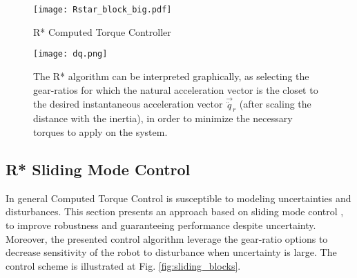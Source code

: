\begin{figure}[t]
	\centering
		\texttt{[image: Rstar\_block\_big.pdf]}
	\caption{R* Computed Torque Controller}
	\label{fig:Rstar_block_big}
\end{figure}

\begin{figure}[htp]
	\centering
		\texttt{[image: dq.png]}
	\caption[R* algorithm graphical interpretation]{The R* algorithm can be interpreted graphically, as selecting the gear-ratios for which the natural acceleration vector is the closet to the desired instantaneous acceleration vector $\vec{\ddot{q}}_r$ (after scaling the distance with the inertia), in order to minimize the necessary torques to apply on the system.}
	\label{fig:dq}
\end{figure}

\subsection{R* Sliding Mode Control}
\label{sec:slidingmode}

In general Computed Torque Control is susceptible to modeling uncertainties and disturbances. This section presents an approach based on sliding mode control \cite{slotine_applied_1991}, to improve robustness and guaranteeing performance despite uncertainty. Moreover, the presented control algorithm leverage the gear-ratio options to decrease sensitivity of the robot to disturbance when uncertainty is large. The control scheme is illustrated at Fig. \ref{fig:sliding_blocks}.

